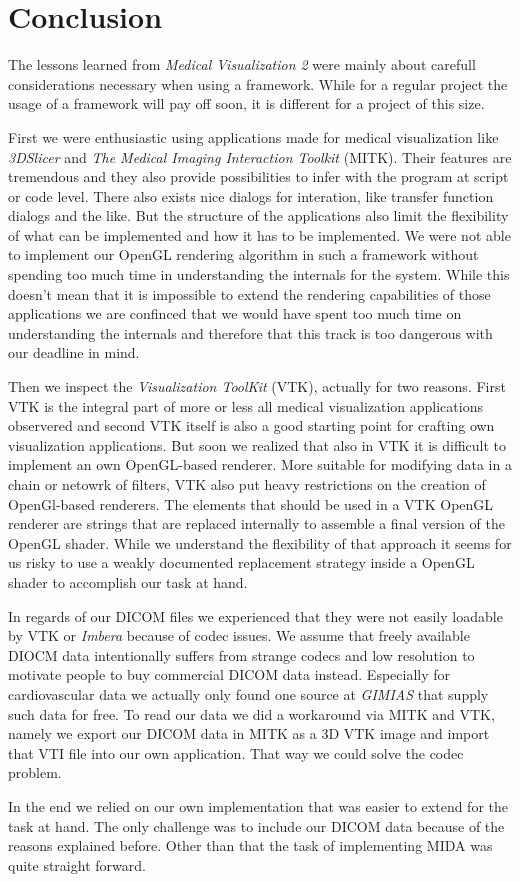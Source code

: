 \section{Conclusion}

The lessons learned from \emph{Medical Visualization 2} were mainly about carefull considerations necessary when using a framework.
While for a regular project the usage of a framework will pay off soon, it is different for a project of this size.

First we were enthusiastic using applications made for medical visualization like \emph{3DSlicer} and \emph{The Medical Imaging Interaction Toolkit} (MITK). Their features are tremendous and they also provide possibilities to infer with the program at script or code level. There also exists nice dialogs for interation, like transfer function dialogs and the like.
But the structure of the applications also limit the flexibility of what can be implemented and how it has to be implemented.
We were not able to implement our OpenGL rendering algorithm in such a framework without spending too much time in understanding the internals for the system. While this doesn't mean that it is impossible to extend the rendering capabilities of those applications we are confinced that we would have spent too much time on understanding the internals and therefore that this track is too dangerous with our deadline in mind. 

Then we inspect the \emph{Visualization ToolKit} (VTK), actually for two reasons. First VTK is the integral part of more or less all medical visualization applications observered and second VTK itself is also a good starting point for crafting own visualization applications.
But soon we realized that also in VTK it is difficult to implement an own OpenGL-based renderer. More suitable for modifying data in a chain or netowrk of filters, VTK also put heavy restrictions on the creation of OpenGl-based renderers. The elements that should be used in a VTK OpenGL renderer are strings that are replaced internally to assemble a final version of the OpenGL shader. While we understand the flexibility of that approach it seems for us risky to use a weakly documented replacement strategy inside a OpenGL shader to accomplish our task at hand.  

In regards of our DICOM files we experienced that they were not easily loadable by VTK or \emph{Imbera} because of codec issues. We assume that freely available DIOCM data intentionally suffers from strange codecs and low resolution to motivate people to buy commercial DICOM data instead.
Especially for cardiovascular data we actually only found one source at \emph{GIMIAS} that supply such data for free.
To read our data we did a workaround via MITK and VTK, namely we export our DICOM data in MITK as a 3D VTK image and import that VTI file into our own application. That way we could solve the codec problem.


In the end we relied on our own implementation that was easier to extend for the task at hand. The only challenge was to include our DICOM data because of the reasons explained before. Other than that the task of implementing MIDA was quite straight forward.

